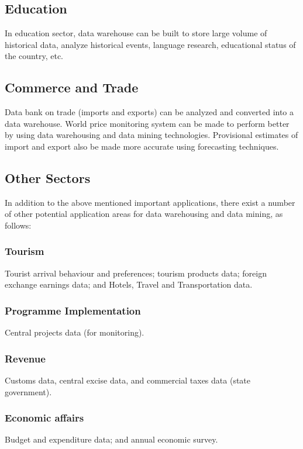 \subsection{Education}
In education sector, data warehouse can be built to store large volume of historical data, analyze historical events, language research, educational status of the country, etc.


\subsection{Commerce and Trade}
Data bank on trade (imports and exports) can be analyzed and converted into
a data warehouse. World price monitoring system can be made to perform
better by using data warehousing and data mining technologies. Provisional
estimates of import and export also be made more accurate using forecasting
techniques.


\subsection{Other Sectors}
In addition to the above mentioned important applications, there exist a number
of other potential application areas for data warehousing and data mining, as
follows:

\subsubsection*{Tourism}
Tourist arrival behaviour and preferences; tourism products
data; foreign exchange earnings data; and Hotels, Travel and Transportation
data.
\subsubsection*{Programme Implementation}
Central projects data (for monitoring).

\subsubsection*{Revenue}
Customs data, central excise data, and commercial taxes data
(state government).

\subsubsection*{Economic affairs}
Budget and expenditure data; and annual economic survey.

